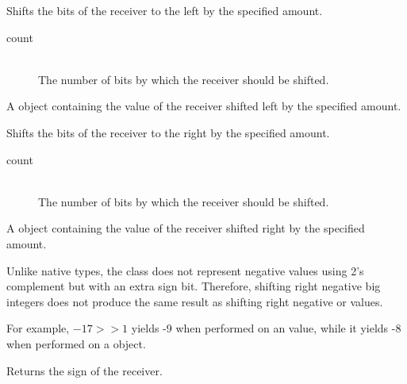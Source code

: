 

Shifts the bits of the receiver to the left by the specified amount.


\docparams

\begin{description}
\item[count] \hfill \\ The number of bits by which the receiver should be shifted.
\end{description}

\docretval

A  object containing the value of the receiver shifted left by the specified amount.



Shifts the bits of the receiver to the right by the specified amount.


\docparams

\begin{description}
\item[count] \hfill \\ The number of bits by which the receiver should be shifted.
\end{description}

\docretval

A  object containing the value of the receiver shifted right by the specified amount.

\docdiscuss

Unlike native types, the  class does not represent negative values using 2's complement but with an extra sign bit. Therefore, shifting right negative big integers does not produce the same result as shifting right negative  or  values.

For example, $-17 >> 1$ yields -9 when performed on an  value, while it yields -8 when performed on a  object.



Returns the sign of the receiver.

